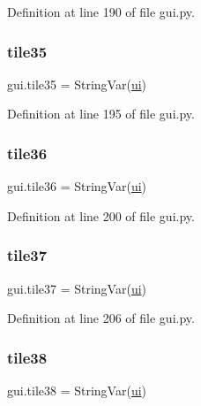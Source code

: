 Definition at line 190 of file gui.\+py.

\mbox{\label{namespacegui_a890f018d64e439ac53ae9d4a3db07d11}} 
\subsubsection{\texorpdfstring{tile35}{tile35}}
{\footnotesize\ttfamily gui.\+tile35 = String\+Var(\mbox{\hyperlink{namespacegui_a40ab7281456eadbea2dc2038f5c24fa1}{ui}})}



Definition at line 195 of file gui.\+py.

\mbox{\label{namespacegui_a8bfddabdd4880420216fb021463971bf}} 
\subsubsection{\texorpdfstring{tile36}{tile36}}
{\footnotesize\ttfamily gui.\+tile36 = String\+Var(\mbox{\hyperlink{namespacegui_a40ab7281456eadbea2dc2038f5c24fa1}{ui}})}



Definition at line 200 of file gui.\+py.

\mbox{\label{namespacegui_ade77e9bd0a3d48134f03d187fd954e11}} 
\subsubsection{\texorpdfstring{tile37}{tile37}}
{\footnotesize\ttfamily gui.\+tile37 = String\+Var(\mbox{\hyperlink{namespacegui_a40ab7281456eadbea2dc2038f5c24fa1}{ui}})}



Definition at line 206 of file gui.\+py.

\mbox{\label{namespacegui_abdae4a8ae6dac245e5f2874fb10bd3d9}} 
\subsubsection{\texorpdfstring{tile38}{tile38}}
{\footnotesize\ttfamily gui.\+tile38 = String\+Var(\mbox{\hyperlink{namespacegui_a40ab7281456eadbea2dc2038f5c24fa1}{ui}})}



